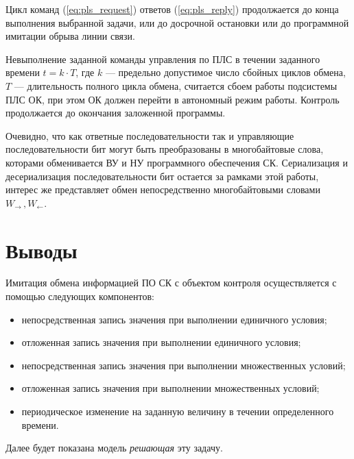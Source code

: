 Цикл команд (\ref{eq:pls_request}) ответов (\ref{eq:pls_reply}) продолжается до конца выполнения выбранной задачи,
или до досрочной остановки
или до программной имитации обрыва линии связи.

Невыполнение заданной команды управления по ПЛС в течении 
заданного времени $t = k \cdot T$, где
$k$ --- предельно допустимое число сбойных циклов обмена,
$T$ --- длительность полного цикла обмена, считается сбоем работы 
подсистемы ПЛС ОК, при этом ОК должен перейти в автономный режим работы. Контроль продолжается до окончания заложенной программы.

Очевидно, что как ответные последовательности так и управляющие последовательности бит
могут быть преобразованы в многобайтовые слова, которами обменивается ВУ и НУ программного обеспечения СК.
Сериализация и десериализация последовательности бит остается за рамками этой работы,
интерес же представляет обмен непосредственно многобайтовыми словами $W_{\longrightarrow}\,,W_{\longleftarrow}$.

\textbf{}

\section*{Выводы}

Имитация обмена информацией ПО СК с объектом контроля осуществляется с помощью следующих компонентов:
\begin{itemize}
    \item непосредственная запись значения при выполнении единичного условия;
    \item отложенная запись значения при выполнении единичного условия;
    \item непосредственная запись значения при выполнении множественных условий;
    \item отложенная запись значения при выполнении множественных условий;
    \item периодическое изменение на заданную величину в течении определенного времени.
\end{itemize}
Далее будет показана модель \textit{решающая} эту задачу.


